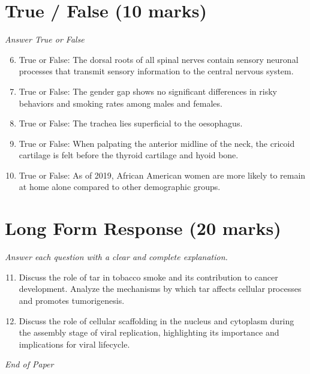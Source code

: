 \documentclass[12pt]{article}
\begin{document}
\section*{True / False (10 marks)}
\textit{Answer True or False}
\begin{enumerate}[label=\arabic*.]
\setcounter{enumi}{5}
\item True or False: The dorsal roots of all spinal nerves contain sensory neuronal processes that transmit sensory information to the central nervous system.
\item True or False: The gender gap shows no significant differences in risky behaviors and smoking rates among males and females.
\item True or False: The trachea lies superficial to the oesophagus.
\item True or False: When palpating the anterior midline of the neck, the cricoid cartilage is felt before the thyroid cartilage and hyoid bone.
\item True or False: As of 2019, African American women are more likely to remain at home alone compared to other demographic groups.
\end{enumerate}

\section*{Long Form Response (20 marks)}
\textit{Answer each question with a clear and complete explanation.}
\begin{enumerate}[label=\arabic*.]
\setcounter{enumi}{10}
\item Discuss the role of tar in tobacco smoke and its contribution to cancer development. Analyze the mechanisms by which tar affects cellular processes and promotes tumorigenesis.
\item Discuss the role of cellular scaffolding in the nucleus and cytoplasm during the assembly stage of viral replication, highlighting its importance and implications for viral lifecycle.
\end{enumerate}

\vfill
\noindent\textit{End of Paper}
\end{document}
